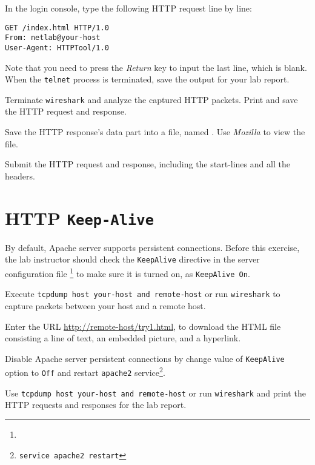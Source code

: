 \documentclass{../UTNetLab}
\begin{document}
    In the login console, type the following HTTP request line by line:
    \begin{lstlisting}[language={HTTP},escapechar={},emph={your-host, remote-host}]
GET /index.html HTTP/1.0
From: netlab@your-host
User-Agent: HTTPTool/1.0

    \end{lstlisting}
    Note that you need to press the \textit{Return} key to input the last line, which is blank.
    When the \lstinline{telnet} process is terminated, save the output for your lab report. 

    Terminate \lstinline{wireshark} and analyze the captured HTTP packets.
    Print and save the HTTP request and response. 

    Save the HTTP response’s data part into a file, named .
    Use \textit{Mozilla} to view the file.
    
    \begin{report}
    \item Submit the HTTP request and response, including the start-lines and all the headers.
    \end{report}

    
\section{HTTP \texttt{Keep-Alive}}
    By default, Apache server supports persistent connections. Before this exercise, the lab instructor should check the \texttt{KeepAlive} directive in the server configuration file \footnote{} to make sure it is turned on, as \lstinline[language={HTTP}]{KeepAlive On}. 

    Execute \lstinline[emph={your-host, remote-host}]{tcpdump host your-host and remote-host} or run \lstinline{wireshark} to capture packets between your host and a remote host. 

    
    Enter the URL \url{http://remote-host/try1.html}, to download the HTML file consisting a line of text, an embedded picture, and a hyperlink.


    Disable Apache server persistent connections by change value of \texttt{KeepAlive} option to \lstinline{Off} and restart \lstinline{apache2} service\footnote{\lstinline{service apache2 restart}}.

    
    Use \lstinline[emph={your-host, remote-host}]{tcpdump host your-host and remote-host} or run \lstinline{wireshark} and print the HTTP requests and responses for the lab report.
    
\end{document}
